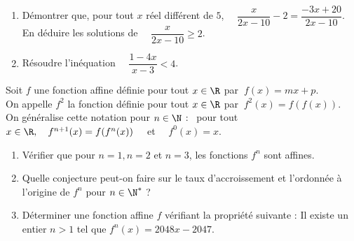 \documentclass[a4paper,11pt,french]{article}
\begin{document}
\begin{enumerate}[\bfseries 1.]
	\item 	Démontrer que, pour tout $x$ réel différent de $5$, $\quad \dfrac{x}{2x-10}-2=\dfrac{-3x+20}{2x-10}$.\\
			En déduire les solutions de $\quad \dfrac{x}{2x-10}\geqslant2$.
	\item 	Résoudre l'inéquation $\quad \dfrac{1-4x}{x-3}<4$.
\end{enumerate}

Soit $f$ une fonction affine définie pour tout $x\in \R$ par $\ f(x)=mx+p$.\\
On appelle $f^2$ la fonction définie pour tout $x\in\R$ par $\ f^2(x)=f(f(x))$.\\
On généralise cette notation pour $n\in\N$ : \ pour tout $x\in\R, \quad f^{n+1}(x)=f(f^n(x)) \quad$ et $\quad f^0(x)=x$.
\begin{enumerate}[\bfseries 1.]
	\item 	Vérifier que pour $n=1, n=2$ et $n=3$, les fonctions $f^n$ sont affines.
	\item 	Quelle conjecture peut-on faire sur le taux d'accroissement et l'ordonnée à l'origine de $f^n$ pour $n\in\N^*$ ?
	\item	Déterminer une fonction affine $f$ vérifiant la propriété suivante : \og Il existe un entier $n>1$ tel que $f^n(x)=2048x-2047$.
\end{enumerate}
\end{document}
